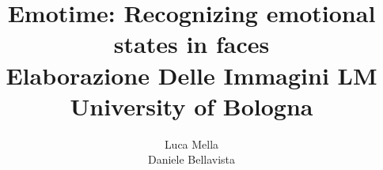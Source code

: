 \documentclass[11pt]{article}
\newcommand{\xautha}{Luca Mella}
\newcommand{\xauthb}{Daniele Bellavista}
\newcommand{\xtitle}{Emotime: Recognizing emotional states in faces\\{\small Elaborazione Delle Immagini LM}\\{University of Bologna}}
\begin{document}
\title{\xtitle}
\author{\xautha\\\xauthb}

\maketitle
\newpage
\newpage
















\nocite{*}

{}
\end{document}
